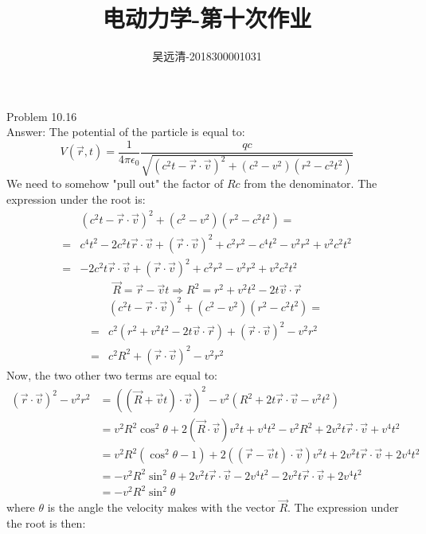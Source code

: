 \documentclass[UTF8]{ctexart}
\title{电动力学-第十次作业}
\author{吴远清-2018300001031}
\begin{document}
	\maketitle
	Problem 10.16\\
	Answer:
	The potential of the particle is equal to:
	$$V(\vec{r}, t)=\frac{1}{4 \pi \epsilon_{0}} \frac{q c}{\sqrt{\left(c^{2} t-\vec{r} \cdot \vec{v}\right)^{2}+\left(c^{2}-v^{2}\right)\left(r^{2}-c^{2} t^{2}\right)}} $$
	We need to somehow "pull out" the factor of $R c$ from the denominator. The expression under the root is:
	$$\begin{aligned}
		&\left(c^{2} t-\vec{r} \cdot \vec{v}\right)^{2}+\left(c^{2}-v^{2}\right)\left(r^{2}-c^{2} t^{2}\right)=\\
		=&c^{4} t^{2}-2 c^{2} t \vec{r} \cdot \vec{v}+(\vec{r} \cdot \vec{v})^{2}+c^{2} r^{2}-c^{4} t^{2}-v^{2} r^{2}+v^{2} c^{2} t^{2} \\
		=&-2 c^{2} t \vec{r} \cdot \vec{v}+(\vec{r} \cdot \vec{v})^{2}+c^{2} r^{2}-v^{2} r^{2}+v^{2} c^{2} t^{2}
	\end{aligned}$$
	$$\vec{R}=\vec{r}-\vec{v} t \Longrightarrow R^{2}=r^{2}+v^{2} t^{2}-2 t \vec{v} \cdot \vec{r}$$
	$$\begin{aligned}
	&\left(c^{2} t-\vec{r} \cdot \vec{v}\right)^{2}+\left(c^{2}-v^{2}\right)\left(r^{2}-c^{2} t^{2}\right)=\\
	=& c^{2}\left(r^{2}+v^{2} t^{2}-2 t \vec{v} \cdot \vec{r}\right)+(\vec{r} \cdot \vec{v})^{2}-v^{2} r^{2} \\
	=& c^{2} R^{2}+(\vec{r} \cdot \vec{v})^{2}-v^{2} r^{2}
	\end{aligned}$$
	Now, the two other two terms are equal to:
	$$\begin{aligned}
	(\vec{r} \cdot \vec{v})^{2}-v^{2} r^{2} &=((\vec{R}+\vec{v} t) \cdot \vec{v})^{2}-v^{2}\left(R^{2}+2 t \vec{r} \cdot \vec{v}-v^{2} t^{2}\right) \\
	&=v^{2} R^{2} \cos ^{2} \theta+2(\vec{R} \cdot \vec{v}) v^{2} t+v^{4} t^{2}-v^{2} R^{2}+2 v^{2} t \vec{r} \cdot \vec{v}+v^{4} t^{2} \\
	&=v^{2} R^{2}\left(\cos ^{2} \theta-1\right)+2((\vec{r}-\vec{v} t) \cdot \vec{v}) v^{2} t+2 v^{2} t \vec{r} \cdot \vec{v}+2 v^{4} t^{2} \\
	&=-v^{2} R^{2} \sin ^{2} \theta+2 v^{2} t \vec{r} \cdot \vec{v}-2 v^{4} t^{2}-2 v^{2} t \vec{r} \cdot \vec{v}+2 v^{4} t^{2} \\
	&=-v^{2} R^{2} \sin ^{2} \theta
	\end{aligned}$$
	where $\theta$ is the angle the velocity makes with the vector $\vec{R}$. The expression under the root is then:
\end{document}
